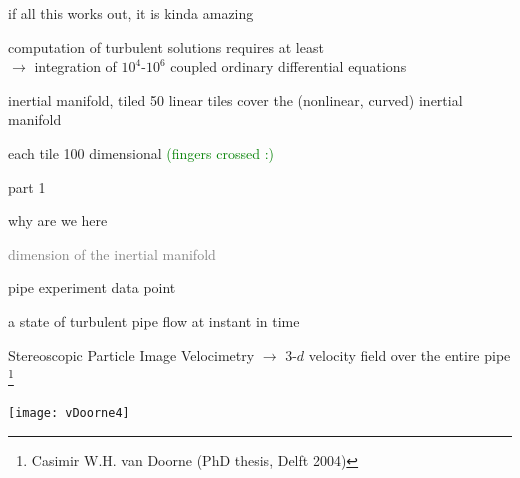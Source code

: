 \begin{frame}{if all this works out, it is kinda amazing}
            \begin{block}{computation of turbulent solutions}
requires at least
\\
$\to$ integration of  $10^4$-$10^6$ coupled ordinary differential equations
            \end{block}

\bigskip

\begin{block}{inertial manifold, tiled}
50 linear tiles cover the (nonlinear, curved) inertial manifold

\medskip

each tile 100 dimensional \hfill \textcolor{green}{\small (fingers crossed :)}
            \end{block}
\end{frame}


\begin{frame}{part 1}
\begin{enumerate}
              \item {\Large
why are we here
                  }\textcolor{gray}{\small
              \item
\statesp
             \item
dimension of the inertial manifold
                    }
            \end{enumerate}
\end{frame}


\begin{frame}{pipe experiment data point}
\begin{block}{a state of turbulent pipe flow at instant in time}
\end{block}

\bigskip

Stereoscopic Particle Image Velocimetry $\to$
3-$d$ velocity field over the entire pipe%
\footnote{\footnotesize
Casimir W.H. van Doorne
(PhD thesis, Delft  2004)
}

\bigskip

\begin{center}
\texttt{[image: vDoorne4]}
\end{center}
\end{frame}

